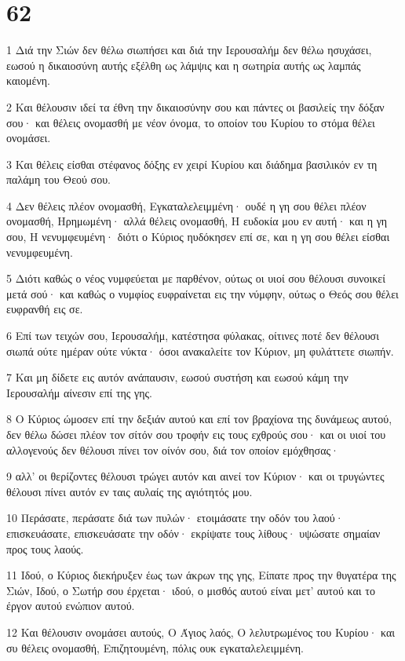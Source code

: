 \chapter{62}

\par 1 Διά την Σιών δεν θέλω σιωπήσει και διά την Ιερουσαλήμ δεν θέλω ησυχάσει, εωσού η δικαιοσύνη αυτής εξέλθη ως λάμψις και η σωτηρία αυτής ως λαμπάς καιομένη.
\par 2 Και θέλουσιν ιδεί τα έθνη την δικαιοσύνην σου και πάντες οι βασιλείς την δόξαν σου· και θέλεις ονομασθή με νέον όνομα, το οποίον του Κυρίου το στόμα θέλει ονομάσει.
\par 3 Και θέλεις είσθαι στέφανος δόξης εν χειρί Κυρίου και διάδημα βασιλικόν εν τη παλάμη του Θεού σου.
\par 4 Δεν θέλεις πλέον ονομασθή, Εγκαταλελειμμένη· ουδέ η γη σου θέλει πλέον ονομασθή, Ηρημωμένη· αλλά θέλεις ονομασθή, Η ευδοκία μου εν αυτή· και η γη σου, Η νενυμφευμένη· διότι ο Κύριος ηυδόκησεν επί σε, και η γη σου θέλει είσθαι νενυμφευμένη.
\par 5 Διότι καθώς ο νέος νυμφεύεται με παρθένον, ούτως οι υιοί σου θέλουσι συνοικεί μετά σού· και καθώς ο νυμφίος ευφραίνεται εις την νύμφην, ούτως ο Θεός σου θέλει ευφρανθή εις σε.
\par 6 Επί των τειχών σου, Ιερουσαλήμ, κατέστησα φύλακας, οίτινες ποτέ δεν θέλουσι σιωπά ούτε ημέραν ούτε νύκτα· όσοι ανακαλείτε τον Κύριον, μη φυλάττετε σιωπήν.
\par 7 Και μη δίδετε εις αυτόν ανάπαυσιν, εωσού συστήση και εωσού κάμη την Ιερουσαλήμ αίνεσιν επί της γης.
\par 8 Ο Κύριος ώμοσεν επί την δεξιάν αυτού και επί τον βραχίονα της δυνάμεως αυτού, δεν θέλω δώσει πλέον τον σίτόν σου τροφήν εις τους εχθρούς σου· και οι υιοί του αλλογενούς δεν θέλουσι πίνει τον οίνόν σου, διά τον οποίον εμόχθησας·
\par 9 αλλ' οι θερίζοντες θέλουσι τρώγει αυτόν και αινεί τον Κύριον· και οι τρυγώντες θέλουσι πίνει αυτόν εν ταις αυλαίς της αγιότητός μου.
\par 10 Περάσατε, περάσατε διά των πυλών· ετοιμάσατε την οδόν του λαού· επισκευάσατε, επισκευάσατε την οδόν· εκρίψατε τους λίθους· υψώσατε σημαίαν προς τους λαούς.
\par 11 Ιδού, ο Κύριος διεκήρυξεν έως των άκρων της γης, Είπατε προς την θυγατέρα της Σιών, Ιδού, ο Σωτήρ σου έρχεται· ιδού, ο μισθός αυτού είναι μετ' αυτού και το έργον αυτού ενώπιον αυτού.
\par 12 Και θέλουσιν ονομάσει αυτούς, Ο Άγιος λαός, Ο λελυτρωμένος του Κυρίου· και συ θέλεις ονομασθή, Επιζητουμένη, πόλις ουκ εγκαταλελειμμένη.

